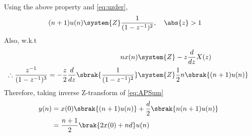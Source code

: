 \begin{enumerate}[label=\thechapter.\arabic*,ref=\thechapter.\theenumi]
Using the above property and \eqref{eq:uzder}, 
\begin{align}
(n+1) u(n) &\system{Z} \frac{1}{({1-z^{-1}})^2}, \quad \abs{z} > 1
\end{align}
Also, w.k.t
\begin{align}
nx(n) &\system{Z} -z\frac{d}{dz}X(z)\\
\therefore \frac{z^{-1}}{(1-z^{-1})^{3}} = -\frac{z}{2}\frac{d}{dz}\sbrak{\frac{1}{(1-z^{-1})^{2}}} &\system{Z} \frac{1}{2}n\sbrak{(n+1)u(n)}
\end{align}
Therefore, taking inverse Z-transform of \eqref{eq:APSum}
\begin{align}
y(n) &= x(0)\sbrak{(n + 1)u(n)} + \frac{d}{2}\sbrak{n(n + 1)u(n)}\\
&= \frac{n+1}{2}\brak{2x(0) + nd}u(n)
\end{align}
\end{enumerate}
